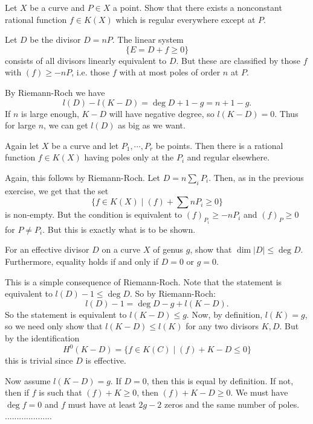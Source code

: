 \documentclass[11pt, english]{article}
\begin{document}
\begin{exc}[Exercise 1.1]
Let $X$ be a curve and $P \in X$ a point. Show that there exists a nonconstant rational function $f \in K(X)$ which is regular everywhere except at $P$.
\end{exc}
\begin{sol}
Let $D$ be the divisor $D=nP$. The linear system 
$$
\{ E = D + f \geq 0 \}
$$
consists of all divisors linearly equivalent to $D$. But these are classified by those $f$ with $(f) \geq -nP$, i.e. those $f$ with at most poles of order $n$ at $P$.

By Riemann-Roch we have
$$
l(D)-l(K-D) = \deg D +1 -g = n+1-g.
$$
If $n$ is large enough, $K-D$ will have negative degree, so $l(K-D)=0$. Thus for large $n$, we can get $l(D)$ as big as we want.
\end{sol}

\begin{exc}[Exercise 1.2]
Again let $X$ be a curve and let $P_1,\cdots,P_r$ be points. Then there is a rational function $f \in K(X)$ having poles only at the $P_i$ and regular elsewhere.
\end{exc}
\begin{exc}
Again, this follows by Riemann-Roch. Let $D=n\sum_i P_i$. Then, as in the previous exercise, we get that the set
$$
\{ f \in K(X) \mid (f) + \sum nP_i \geq 0 \}
$$
is non-empty. But the condition is equivalent to $(f)_{P_i} \geq -nP_i$ and $(f)_P \geq 0$ for $P \neq P_i$. But this is exactly what is to be shown.
\end{exc}


\begin{exc}[Exercise 1.5]
For an effective divisor $D$ on a curve $X$ of genus $g$, show that $\dim \lvert D \rvert \leq \deg D$. Furthermore, equality holds if and only if $D=0$ or $g=0$. 
\end{exc}
\begin{sol}
This is a simple consequence of Riemann-Roch. Note that the statement is equivalent to $l(D) - 1 \leq \deg D$. So by Riemann-Roch:
\[
l(D)-1 = \deg D - g + l(K-D).
\]
So the statement is equivalent to $l(K-D) \leq g$. Now, by definition, $l(K)=g$, so we need only show that $l(K-D) \leq l(K)$ for any two divisors $K,D$. But by the identification
$$
H^0(K-D)=\{ f \in K(C) \mid (f) + K-D \leq 0 \}
$$
this is trivial since $D$ is effective.

Now assume $l(K-D)=g$. If $D=0$, then this is equal by definition. If not, then if $f$ is such that $(f) + K \geq 0$, then $(f) + K-D \geq 0$. We must have $\deg f = 0$ and $f$ must have at least $2g-2$ zeros and the same number of poles. ....................
\end{sol}
\end{document}
